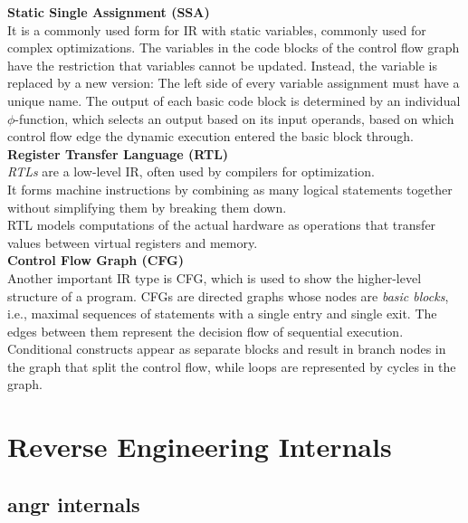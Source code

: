 \documentclass[seminar]{plai}
\begin{document}
\noindent\textbf{Static Single Assignment (SSA)}\\
It is a commonly used form for IR with static variables, commonly used for complex optimizations. The variables in the code blocks of the control flow graph have the restriction that variables cannot be updated. Instead, the variable is replaced by a new version:\cite{introduction-to-compilers-and-language-design}
The left side of every variable assignment must have a unique name.
The output of each basic code block is determined by an individual $\phi$-function, which selects an output based on its input operands, based on which control flow edge the dynamic execution entered the basic block through.\cite{interpreting-programs-in-SSA-form}\\

\noindent\textbf{Register Transfer Language (RTL)}\\
\textit{RTLs} are a low-level IR, often used by compilers for optimization.\\
It forms machine instructions by combining as many logical statements together without simplifying them by breaking them down.\\
RTL models computations of the actual hardware as operations that transfer values between virtual registers and memory.\\

\noindent\textbf{Control Flow Graph (CFG)}\\
Another important IR type is CFG, which is used to show the higher-level structure of a program. CFGs are directed graphs whose nodes are \textit{basic blocks}, i.e., maximal sequences of statements with a single entry and single exit. The edges between them represent the decision flow of sequential execution. Conditional constructs appear as separate blocks and result in branch nodes in the graph that split the control flow, while loops are represented by cycles in the graph.\cite{introduction-to-compilers-and-language-design}
\section{Reverse Engineering Internals}
\label{sec:reverse-engineering-internals}

\subsection{angr internals}
\label{sec:angr-internals}
\end{document}
